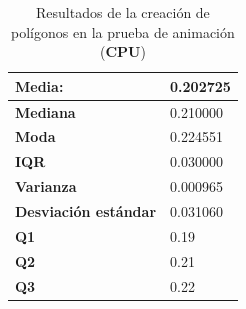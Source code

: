 \begin{table}[htp]
\centering


    
    \begin{center}
    \begin{tabular}{ | l | l | }
        
        
        \hline
        \textbf{Media: }  & 0.202725 \\
        \hline
        \textbf{Mediana} & 0.210000 \\
        \hline
        \textbf{Moda} & 0.224551 \\
        \hline
        \textbf{IQR} & 0.030000 \\
        \hline
        \textbf{Varianza} & 0.000965 \\
        \hline
        \textbf{Desviación estándar} & 0.031060 \\
        \hline
        \textbf{Q1} & 0.19 \\
        \hline
        \textbf{Q2} & 0.21 \\
        \hline
        \textbf{Q3} & 0.22 \\
        \hline
        
    \end{tabular} 
    \end{center}
    
    \caption{Resultados de la creación de polígonos en la prueba de animación (\textbf{CPU})}
    
    \label{table:results-animation-polygons}
\end{table}